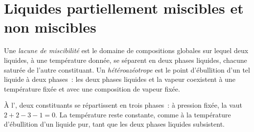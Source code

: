\section{Liquides partiellement miscibles et non miscibles}

\begin{definition}\label{def:b2:liquid-vapour-diagrams:miscibility-gap}
Une \emph{lacune de miscibilité} est le domaine de compositions
globales sur lequel deux liquides, à une température donnée, se séparent en deux
phases liquides, chacune saturée de l'autre constituant. Un
\emph{hétéroazéotrope} est le point d'ébullition d'un tel
liquide à deux phases~: les deux phases liquides et la vapeur coexistent à une
température fixée et avec une composition de vapeur fixée.
\end{definition}

À l', deux constituants se répartissent en trois phases~: à pression
fixée, la  vaut $2 + 2 - 3 - 1 = 0$. La température reste
constante, comme à la température d'ébullition d'un liquide pur, tant que les deux phases liquides
subsistent.

